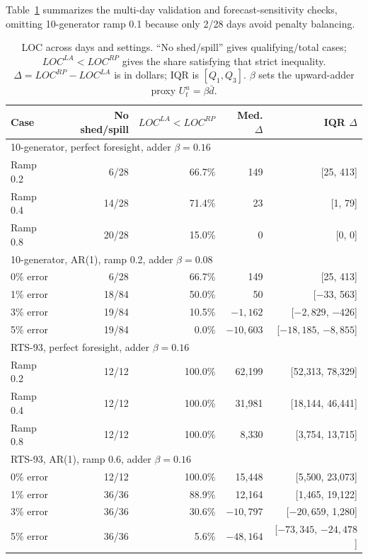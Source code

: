 \documentclass[conference]{IEEEtran}
\begin{document}
Table~\ref{tab:robustness_summary} summarizes the multi-day validation and forecast-sensitivity checks, omitting 10-generator ramp 0.1 because only 2/28 days avoid penalty balancing.

\begin{table}[!b]
\caption{LOC across days and settings. ``No shed/spill'' gives qualifying/total cases; $LOC^{LA}<LOC^{RP}$ gives the share satisfying that strict inequality. $\Delta=LOC^{RP}-LOC^{LA}$ is in dollars; IQR is $[Q_1,Q_3]$. $\beta$ sets the upward-adder proxy $U_t^u=\beta\bar d$.}
\label{tab:robustness_summary}
\centering
\scriptsize
\setlength{\tabcolsep}{1.8pt}
\renewcommand{\arraystretch}{0.90}
\begin{tabular}{lrrrr}
\toprule
Case & No shed/spill & $LOC^{LA}<LOC^{RP}$ & Med. $\Delta$ & IQR $\Delta$ \\
\midrule
\multicolumn{5}{l}{10-generator, perfect foresight, adder $\beta=0.16$} \\
Ramp 0.2 & 6/28 & 66.7\% & 149 & [25, 413] \\
Ramp 0.4 & 14/28 & 71.4\% & 23 & [1, 79] \\
Ramp 0.8 & 20/28 & 15.0\% & 0 & [0, 0] \\
\midrule
\multicolumn{5}{l}{10-generator, AR(1), ramp 0.2, adder $\beta=0.08$} \\
0\% error & 6/28 & 66.7\% & 149 & [25, 413] \\
1\% error & 18/84 & 50.0\% & 50 & [$-33$, 563] \\
3\% error & 19/84 & 10.5\% & $-1{,}162$ & [$-2{,}829$, $-426$] \\
5\% error & 19/84 & 0.0\% & $-10{,}603$ & [$-18{,}185$, $-8{,}855$] \\
\midrule
\multicolumn{5}{l}{RTS-93, perfect foresight, adder $\beta=0.16$} \\
Ramp 0.2 & 12/12 & 100.0\% & 62{,}199 & [52{,}313, 78{,}329] \\
Ramp 0.4 & 12/12 & 100.0\% & 31{,}981 & [18{,}144, 46{,}441] \\
Ramp 0.8 & 12/12 & 100.0\% & 8{,}330 & [3{,}754, 13{,}715] \\
\midrule
\multicolumn{5}{l}{RTS-93, AR(1), ramp 0.6, adder $\beta=0.16$} \\
0\% error & 12/12 & 100.0\% & 15{,}448 & [5{,}500, 23{,}073] \\
1\% error & 36/36 & 88.9\% & 12{,}164 & [1{,}465, 19{,}122] \\
3\% error & 36/36 & 30.6\% & $-10{,}797$ & [$-20{,}659$, 1{,}280] \\
5\% error & 36/36 & 5.6\% & $-48{,}164$ & [$-73{,}345$, $-24{,}478$] \\
\bottomrule
\end{tabular}
\renewcommand{\arraystretch}{1}
\end{table}
\end{document}
